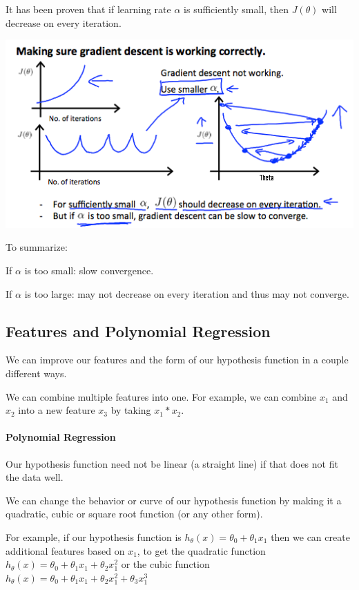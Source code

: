 \documentclass[UTF8]{article}
\begin{document}
It has been proven that if learning rate $\alpha$ is sufficiently small, then $J(\theta)$ will decrease on every iteration.

\includegraphics[width = \textwidth]{NotePics/4_2_2_2.png}

To summarize:

If $\alpha$ is too small: slow convergence.

If $\alpha$ is too large: may not decrease on every iteration and thus may not converge.

\subsection{Features and Polynomial Regression}

We can improve our features and the form of our hypothesis function in a couple different ways.

We can combine multiple features into one. For example, we can combine $x_1$ and $x_2$ into a new feature $x_3$ by taking $x_1*x_2$.

\paragraph{Polynomial Regression}

Our hypothesis function need not be linear (a straight line) if that does not fit the data well.

We can change the behavior or curve of our hypothesis function by making it a quadratic, cubic or square root function (or any other form).

For example, if our hypothesis function is $h_\theta(x) = \theta_0 + \theta_1 x_1$ then we can create additional features based on $x_1$, to get the quadratic function $h_\theta(x) = \theta_0 + \theta_1 x_1 + \theta_2 x_1^2$ or the cubic function $h_\theta(x) = \theta_0 + \theta_1 x_1 + \theta_2 x_1^2 + \theta_3 x_1^3$
\end{document}
